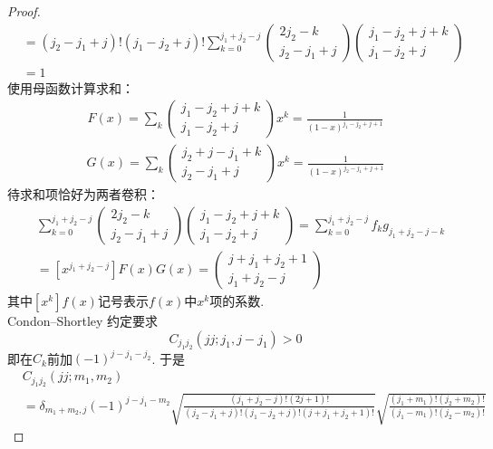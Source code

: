 \begin{proof}
\begin{align*}
&= (j_2-j_1+j)!(j_1-j_2 + j)!\sum_{k=0}^{j_1+j_2-j}\left(\begin{matrix}2j_2-k\\j_2-j_1+j\end{matrix}\right)\left(\begin{matrix}j_1-j_2+j+k\\j_1-j_2+j\end{matrix}\right)\\
&=1
\end{align*}
使用母函数计算求和：
\begin{align*}
    F(x) = \sum_{k}\left(\begin{matrix}j_1-j_2+j+k\\j_1-j_2+j\end{matrix}\right) x^k = \frac{1}{(1-x)^{j_1-j_2+j+1}}
\end{align*}
\begin{align*}
    G(x) = \sum_{k}\left(\begin{matrix}j_2+j-j_1+k\\j_2-j_1+j\end{matrix}\right)x^k =\frac{1}{(1-x)^{j_2-j_1+j+1}}
\end{align*}
待求和项恰好为两者卷积：
\begin{align*}
    &\sum_{k=0}^{j_1+j_2-j}\left(\begin{matrix}2j_2-k\\j_2-j_1+j\end{matrix}\right)\left(\begin{matrix}j_1-j_2+j+k\\j_1-j_2+j\end{matrix}\right) = \sum_{k=0}^{j_1+j_2-j} f_k g_{j_1+j_2-j-k}\\
    &= [x^{j_1+j_2-j}]F(x)G(x) = \left(\begin{matrix}j+j_1+j_2+1\\j_1+j_2-j\end{matrix}\right)
\end{align*}
其中$[x^k]f(x)$记号表示$f(x)$中$x^k$项的系数.\\
 Condon–Shortley 约定要求
 $$
 C_{j_1j_2}(jj;j_1,j-j_1) > 0
 $$
 即在$C_k$前加$(-1)^{j-j_1-j_2}$.
 于是
\begin{align*}
    &C_{j_1j_2}(j j;m_1,m_2) \\
    &= \delta_{m_1+m_2,j}(-1)^{j-j_1-m_2}\sqrt{\frac{(j_1+j_2-j)!(2j+1)!}{(j_2-j_1+j)!(j_1-j_2 + j)!(j+j_1+j_2+1)!}}\sqrt{\frac{(j_1+m_1)!(j_2+m_2)!}{(j_1-m_1)!(j_2-m_2)!}}
\end{align*}


\end{proof}
